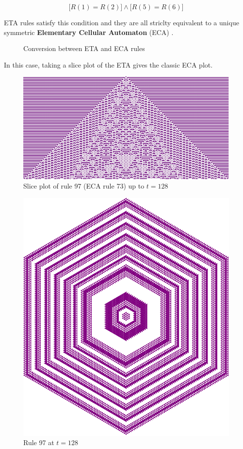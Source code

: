 \documentclass{article}
\begin{document}
\begin{equation}
    \Big[R(1)=R(2)\Big] \land \Big[R(5)=R(6)\Big]
\end{equation}

 ETA rules satisfy this condition and they are all striclty equivalent to a unique symmetric \textbf{Elementary Cellular Automaton} (ECA) \cite{wolfram2002new}.

\begin{figure}[H]
    \centering
    \caption{Conversion between ETA and ECA rules}
    \label{fig:ETA-to-ECA}
\end{figure}

\noindent In this case, taking a slice plot of the ETA gives the classic ECA plot.

\begin{figure}[H]
    \centering
    \includegraphics[width=.65\textwidth]{graphics/behavior/elementary-cellular-automata/rule-97-slice-plot-128.jpg}
    \caption{Slice plot of rule 97 (ECA rule 73) up to $t=128$}
    \label{fig:rule-97-slice-plot-128}
\end{figure}

\vspace{-10pt}

\begin{figure}[H]
    \centering
    \includegraphics[width=.4\textwidth]{graphics/behavior/elementary-cellular-automata/rule-97-time-128.pdf}
    \caption{Rule 97 at $t=128$}
    \label{fig:rule-97-time-128}
\end{figure}
\end{document}
